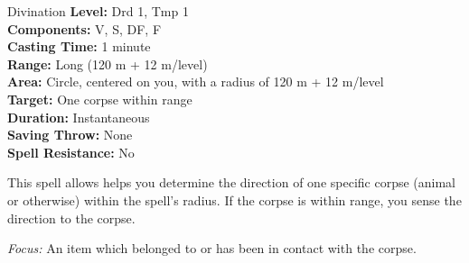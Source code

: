 {Divination}
{
	\textbf{Level:}
	Drd 1, Tmp 1\\
	\textbf{Components:}
	V, S, DF, F\\
	\textbf{Casting Time:}
	1 minute\\
	\textbf{Range:}
	Long (120 m + 12 m/level)\\
	\textbf{Area:}
	Circle, centered on you, with a radius of 120 m + 12 m/level\\
	\textbf{Target:}
	One corpse within range\\
	\textbf{Duration:}
	Instantaneous\\
	\textbf{Saving Throw:}
	None\\
	\textbf{Spell Resistance:}
	No\\
}
{
	This spell allows helps you determine the direction of one specific corpse (animal or otherwise) within the spell's radius. If the corpse is within range, you sense the direction to the corpse.

	\textit{Focus:} An item which belonged to or has been in contact with the corpse.
}